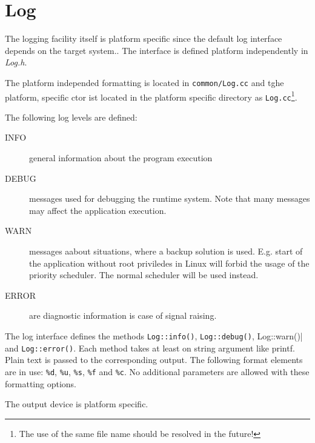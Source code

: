 \chapter{Log}
The logging facility itself is platform specific since the
default log interface depends on the target system.. The interface is 
defined platform independently in {\em Log.h}.

The platform independed formatting is located in \verb|common/Log.cc|
and tghe platform, specific ctor ist located in the platform specific
directory as \verb|Log.cc|\footnote{The use of the same file name 
should be resolved in the future!}. 

The following log levels are defined:
\begin{description}
\item[INFO] general information about the program execution
\item[DEBUG] messages used for debugging the runtime system. Note that
   many messages may affect the application execution.
\item[WARN] messages aabout situations, where a backup solution is used.
E.g. start of the application without root priviledes in Linux will 
forbid the usage of the priority scheduler. The normal scheduler will be 
used instead.
\item[ERROR] are diagnostic information is case of signal raising.
\end{description}

The log interface defines the methods
\verb|Log::info()|, \verb|Log::debug()|, Log::warn()| and \verb|Log::error()|.
Each method takes at least on string argument like printf.
Plain text is passed to the corresponding output.
The following format elements are in use: \verb|%d|, \verb|%u|, \verb|%s|,
\verb|%f| and \verb|%c|. No additional parameters are allowed with these 
formatting options.

The output device is platform specific.
